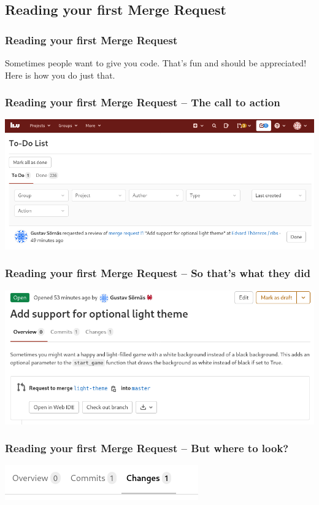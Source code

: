 \documentclass{beamer}
\begin{document}
\subsection{Reading your first Merge Request}

\begin{frame}[fragile]
  \frametitle{Reading your first Merge Request}

  Sometimes people want to give you code. That's fun and should be appreciated! \\[1em]
  Here is how you do just that.

\end{frame}

\begin{frame}[fragile]
  \frametitle{Reading your first Merge Request -- The call to action}
  \includegraphics[width=\linewidth]{gitlab-first-review/01-notification.png}
\end{frame}

\begin{frame}[fragile]
  \frametitle{Reading your first Merge Request -- So that's what they did}
  \includegraphics[width=\linewidth]{gitlab-first-review/02-reding.png}
\end{frame}

\begin{frame}[fragile]
  \frametitle{Reading your first Merge Request -- But where to look?}
  \includegraphics[width=\linewidth]{gitlab-first-review/03-changes.png}
\end{frame}
\end{document}

